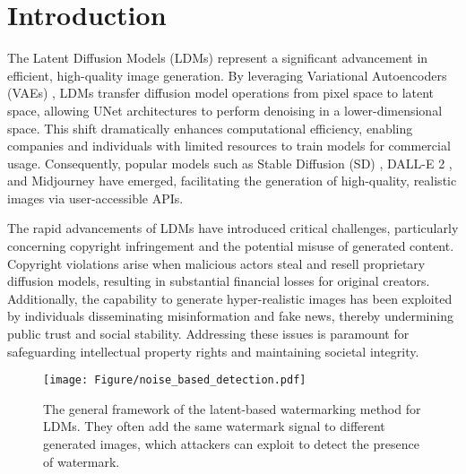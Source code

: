 \section{Introduction}
\label{sec:intro}

The Latent Diffusion Models (LDMs)  \cite{rombach2022high} represent a significant advancement in efficient, high-quality image generation.
By leveraging Variational Autoencoders (VAEs) \cite{Kingma2014}, LDMs transfer diffusion model operations from pixel space to latent space, allowing UNet \cite{ronneberger2015u} architectures to perform denoising in a lower-dimensional space. 
This shift dramatically enhances computational efficiency, enabling companies and individuals with limited resources to train models for commercial usage.
Consequently, popular models such as Stable Diffusion (SD) \cite{fernandez2023stable}, DALL-E 2 \cite{ramesh2022hierarchical}, and Midjourney \cite{midjourney} have emerged, facilitating the generation of high-quality, realistic images via user-accessible APIs.
 
The rapid advancements of LDMs have introduced critical challenges, particularly concerning copyright infringement and the potential misuse of generated content. Copyright violations arise when malicious actors steal and resell proprietary diffusion models, resulting in substantial financial losses for original creators. Additionally, the capability to generate hyper-realistic images has been exploited by individuals disseminating misinformation and fake news, thereby undermining public trust and social stability. Addressing these issues is paramount for safeguarding intellectual property rights and maintaining societal integrity.

\begin{figure}
    \centering
    \texttt{[image: Figure/noise\_based\_detection.pdf]}
    \vspace{-0.6cm}
    \caption{The general framework of the latent-based watermarking method for LDMs. They often add the same watermark signal to different generated images, which attackers can exploit to detect the presence of watermark. 
    }
    \vspace{-0.6cm}
    \label{fig:l-r-b_method_framework}
\end{figure}


